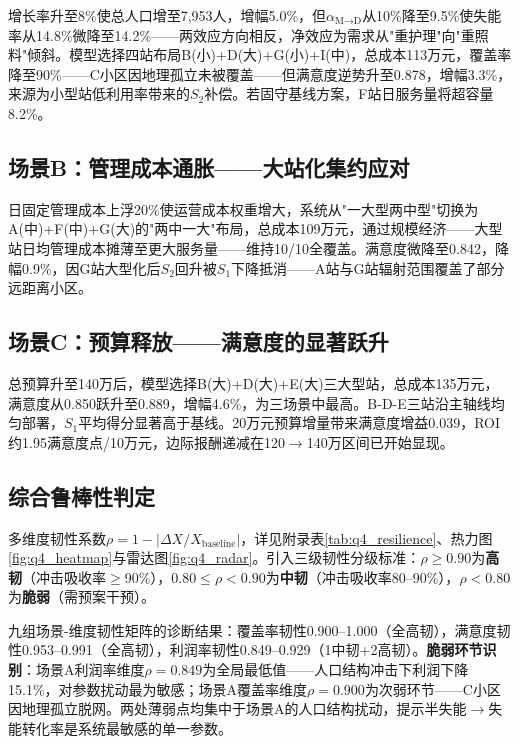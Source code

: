 增长率升至8\%使总人口增至7,953人，增幅5.0\%，但$\alpha_{\text{M}\to\text{D}}$从10\%降至9.5\%使失能率从14.8\%微降至14.2\%——两效应方向相反，净效应为需求从"重护理"向"重照料"倾斜。模型选择四站布局B(小)+D(大)+G(小)+I(中)，总成本113万元，覆盖率降至90\%——C小区因地理孤立未被覆盖——但满意度逆势升至0.878，增幅3.3\%，来源为小型站低利用率带来的$S_2$补偿。若固守基线方案，F站日服务量将超容量8.2\%。

\subsection{场景B：管理成本通胀——大站化集约应对}

日固定管理成本上浮20\%使运营成本权重增大，系统从"一大型两中型"切换为A(中)+F(中)+G(大)的"两中一大"布局，总成本109万元，通过规模经济——大型站日均管理成本摊薄至更大服务量——维持10/10全覆盖。满意度微降至0.842，降幅0.9\%，因G站大型化后$S_2$回升被$S_1$下降抵消——A站与G站辐射范围覆盖了部分远距离小区。

\subsection{场景C：预算释放——满意度的显著跃升}

总预算升至140万后，模型选择B(大)+D(大)+E(大)三大型站，总成本135万元，满意度从0.850跃升至0.889，增幅4.6\%，为三场景中最高。B-D-E三站沿主轴线均匀部署，$S_1$平均得分显著高于基线。20万元预算增量带来满意度增益0.039，ROI约1.95满意度点/10万元，边际报酬递减在120$\to$140万区间已开始显现。

\subsection{综合鲁棒性判定}

多维度韧性系数$\rho = 1 - |\Delta X / X_{\text{baseline}}|$，详见附录表\ref{tab:q4_resilience}、热力图\ref{fig:q4_heatmap}与雷达图\ref{fig:q4_radar}。引入三级韧性分级标准：$\rho\ge0.90$为\textbf{高韧}（冲击吸收率$\ge$90\%），$0.80\le\rho<0.90$为\textbf{中韧}（冲击吸收率80--90\%），$\rho<0.80$为\textbf{脆弱}（需预案干预）。

九组场景-维度韧性矩阵的诊断结果：覆盖率韧性0.900--1.000（全高韧），满意度韧性0.953--0.991（全高韧），利润率韧性0.849--0.929（1中韧+2高韧）。\textbf{脆弱环节识别}：场景A利润率维度$\rho=0.849$为全局最低值——人口结构冲击下利润下降15.1\%，对参数扰动最为敏感；场景A覆盖率维度$\rho=0.900$为次弱环节——C小区因地理孤立脱网。两处薄弱点均集中于场景A的人口结构扰动，提示半失能$\to$失能转化率是系统最敏感的单一参数。

